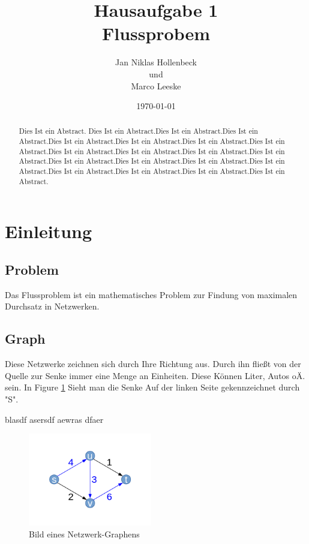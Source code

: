 \documentclass[11pt]{article}
\title{Hausaufgabe 1 \\ Flussprobem}
\author{Jan Niklas Hollenbeck \\ und \\ Marco Leeske}
\date{\today}
\begin{document}
\maketitle
\newpage
\begin{abstract}
Dies Ist ein Abstract. Dies Ist ein Abstract.Dies Ist ein Abstract.Dies Ist ein Abstract.Dies Ist ein Abstract.Dies Ist ein Abstract.Dies Ist ein Abstract.Dies Ist ein Abstract.Dies Ist ein Abstract.Dies Ist ein Abstract.Dies Ist ein Abstract.Dies Ist ein Abstract.Dies Ist ein Abstract.Dies Ist ein Abstract.Dies Ist ein Abstract.Dies Ist ein Abstract.Dies Ist ein Abstract.Dies Ist ein Abstract.Dies Ist ein Abstract.Dies Ist ein Abstract.
\end{abstract}

\section{Einleitung}
\subsection{Problem}
Das Flussproblem ist ein mathematisches Problem zur Findung von maximalen Durchsatz in Netzwerken.
\subsection{Graph}
Diese Netzwerke zeichnen sich durch Ihre Richtung aus. Durch ihn fließt von der Quelle zur Senke immer eine Menge an Einheiten. Diese Können Liter, Autos oÄ. sein. In Figure \ref{fig:Graph1} Sieht man die Senke Auf der linken Seite gekennzeichnet durch "S".

\citet{Testref}blasdf asersdf aewras dfaer

\begin{figure}[h] 
  \centering
     \includegraphics[width=0.48\textwidth]{graph1} 
  \caption{Bild eines Netzwerk-Graphens}
  \label{fig:Graph1}
\end{figure}


\end{document}
